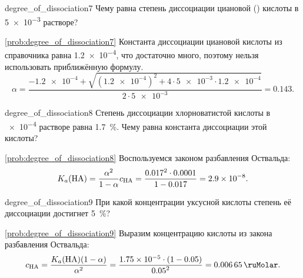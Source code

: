 \begin{problem}{}{degree_of_dissociation7}
    Чему равна степень диссоциации циановой () кислоты в \qty{5e-3}{\ruMolar} растворе?
    \begin{sol}{\ref{prob:degree_of_dissociation7}}
        Константа диссоциации циановой кислоты из справочника равна \num{1,2e-4}, что достаточно много, поэтому нельзя использовать приближённую формулу.
        \begin{equation*}
            \alpha = \frac{-\num{1,2e-4} + \sqrt{(\num{1,2e-4})^2 + 4 \cdot \num{5e-3} \cdot \num{1,2e-4}}}
            {2 \cdot \num{5e-3}}
            = \num{0,143}.
        \end{equation*}
    \end{sol}
\end{problem}

\begin{problem}{}{degree_of_dissociation8}
    Степень диссоциации хлорноватистой кислоты в \qty{e-4}{\ruMolar} растворе равна \qty{1,7}{\percent}. Чему равна константа диссоциации этой кислоты?
    \begin{sol}{\ref{prob:degree_of_dissociation8}}
        Воспользуемся законом разбавления Оствальда:
        \begin{equation*}
            K_a(\ce{HA}) = \frac{{\alpha}^2}{1 - \alpha}c_{\ce{HA}}
            = \frac{{\num{0,017}}^2 \cdot \num{0,0001}}{1 - \num{0,017}}
            = \num{2,9e-8}.
        \end{equation*}
    \end{sol}
\end{problem}

\begin{problem}{}{degree_of_dissociation9}
    При какой концентрации уксусной кислоты степень её диссоциации достигнет \qty{5}{\percent}?
    \begin{sol}{\ref{prob:degree_of_dissociation9}}
        Выразим концентрацию кислоты из закона разбавления Оствальда:
        \begin{equation*}
            c_{\ce{HA}} = \frac{K_a(\ce{HA})(1 - \alpha)}{{\alpha}^2}
            = \frac{\num{1,75e-5} \cdot (1 - \num{0,05})}{{\num{0,05}}^2}
            = \qty{0,00665}{\ruMolar}.
        \end{equation*}
    \end{sol}
\end{problem}

